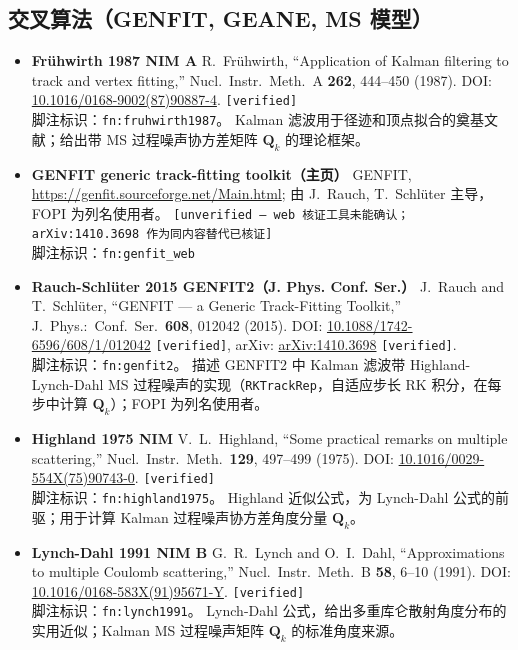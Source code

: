 \documentclass[a4paper, 11pt]{article}
\begin{document}
\begin{itemize}[leftmargin=2em,itemsep=3pt]
\end{itemize}

\subsection{交叉算法（GENFIT, GEANE, MS 模型）}

\begin{itemize}[leftmargin=2em,itemsep=3pt]

\item \textbf{Frühwirth 1987 NIM A} \quad
R.~Frühwirth, ``Application of Kalman filtering to track and vertex fitting,''
Nucl.\ Instr.\ Meth.\ A \textbf{262}, 444--450 (1987).
DOI: \href{https://doi.org/10.1016/0168-9002(87)90887-4}{10.1016/0168-9002(87)90887-4}.
\texttt{[verified]}
\\
脚注标识：\texttt{fn:fruhwirth1987}。
Kalman 滤波用于径迹和顶点拟合的奠基文献；给出带 MS 过程噪声协方差矩阵 $\mathbf{Q}_k$ 的理论框架。

\item \textbf{GENFIT generic track-fitting toolkit（主页）} \quad
GENFIT, \url{https://genfit.sourceforge.net/Main.html};
由 J.~Rauch, T.~Schlüter 主导，FOPI 为列名使用者。
\texttt{[unverified --- web 核证工具未能确认；arXiv:1410.3698 作为同内容替代已核证]}
\\
脚注标识：\texttt{fn:genfit\_web}

\item \textbf{Rauch-Schlüter 2015 GENFIT2（J. Phys. Conf. Ser.）} \quad
J.~Rauch and T.~Schlüter, ``GENFIT --- a Generic Track-Fitting Toolkit,''
J.\ Phys.:\ Conf.\ Ser.\ \textbf{608}, 012042 (2015).
DOI: \href{https://doi.org/10.1088/1742-6596/608/1/012042}{10.1088/1742-6596/608/1/012042} \texttt{[verified]},
arXiv: \href{https://arxiv.org/abs/1410.3698}{arXiv:1410.3698} \texttt{[verified]}.
\\
脚注标识：\texttt{fn:genfit2}。
描述 GENFIT2 中 Kalman 滤波带 Highland-Lynch-Dahl MS 过程噪声的实现（\texttt{RKTrackRep}，自适应步长 RK 积分，在每步中计算 $\mathbf{Q}_k$）；FOPI 为列名使用者。

\item \textbf{Highland 1975 NIM} \quad
V.~L.~Highland, ``Some practical remarks on multiple scattering,''
Nucl.\ Instr.\ Meth.\ \textbf{129}, 497--499 (1975).
DOI: \href{https://doi.org/10.1016/0029-554X(75)90743-0}{10.1016/0029-554X(75)90743-0}.
\texttt{[verified]}
\\
脚注标识：\texttt{fn:highland1975}。
Highland 近似公式，为 Lynch-Dahl 公式的前驱；用于计算 Kalman 过程噪声协方差角度分量 $\mathbf{Q}_k$。

\item \textbf{Lynch-Dahl 1991 NIM B} \quad
G.~R.~Lynch and O.~I.~Dahl, ``Approximations to multiple Coulomb scattering,''
Nucl.\ Instr.\ Meth.\ B \textbf{58}, 6--10 (1991).
DOI: \href{https://doi.org/10.1016/0168-583X(91)95671-Y}{10.1016/0168-583X(91)95671-Y}.
\texttt{[verified]}
\\
脚注标识：\texttt{fn:lynch1991}。
Lynch-Dahl 公式，给出多重库仑散射角度分布的实用近似；Kalman MS 过程噪声矩阵 $\mathbf{Q}_k$ 的标准角度来源。

\end{itemize}
\end{document}
